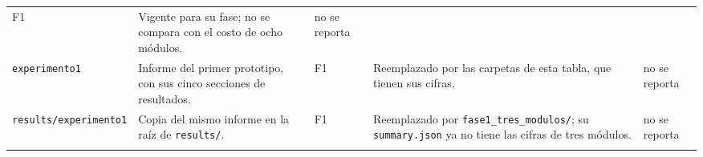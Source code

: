 \begin{table}[H]
\begin{tabular}{p{3.1cm}p{4.7cm}p{2.0cm}p{3.1cm}p{1.6cm}}
\raggedright F1 &
\raggedright Vigente para su fase; no se compara con el costo de ocho módulos. &
\raggedright no se reporta \tabularnewline\addlinespace[4pt]
\raggedright \texttt{experimento1} &
\raggedright Informe del primer prototipo, con sus cinco secciones de resultados. &
\raggedright F1 &
\raggedright Reemplazado por las carpetas de esta tabla, que tienen sus cifras. &
\raggedright no se reporta \tabularnewline\addlinespace[4pt]
\raggedright \texttt{results/\allowbreak experimento1} &
\raggedright Copia del mismo informe en la raíz de \texttt{results/}. &
\raggedright F1 &
\raggedright Reemplazado por \texttt{fase1\_\allowbreak tres\_\allowbreak modulos/}; su \texttt{summary.json} ya no tiene las cifras de tres módulos. &
\raggedright no se reporta \tabularnewline\addlinespace[4pt]
\bottomrule
\end{tabular}
\end{table}

